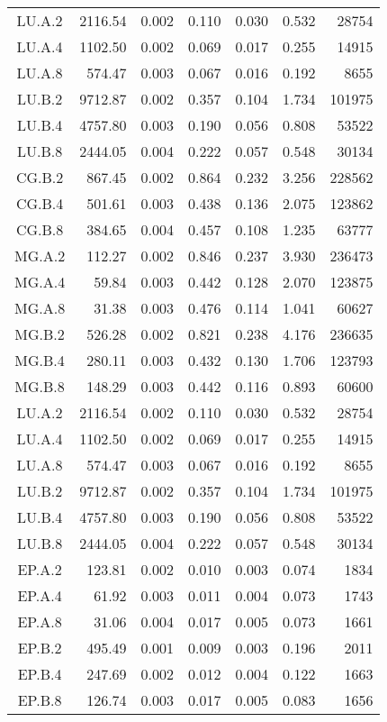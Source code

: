 \begin{longtable}[c]{c*{6}{r}}
	LU.A.2 & 2116.54 & 0.002 & 0.110 & 0.030 & 0.532 & 28754 \\
	LU.A.4 & 1102.50 & 0.002 & 0.069 & 0.017 & 0.255 & 14915 \\
	LU.A.8 & 574.47 & 0.003 & 0.067 & 0.016 & 0.192 & 8655 \\
	LU.B.2 & 9712.87 & 0.002 & 0.357 & 0.104 & 1.734 & 101975 \\
	LU.B.4 & 4757.80 & 0.003 & 0.190 & 0.056 & 0.808 & 53522 \\
	LU.B.8 & 2444.05 & 0.004 & 0.222 & 0.057 & 0.548 & 30134 \\
	CG.B.2 & 867.45 & 0.002 & 0.864 & 0.232 & 3.256 & 228562 \\
	CG.B.4 & 501.61 & 0.003 & 0.438 & 0.136 & 2.075 & 123862 \\
	CG.B.8 & 384.65 & 0.004 & 0.457 & 0.108 & 1.235 & 63777 \\
	MG.A.2 & 112.27 & 0.002 & 0.846 & 0.237 & 3.930 & 236473 \\
	MG.A.4 & 59.84 & 0.003 & 0.442 & 0.128 & 2.070 & 123875 \\
	MG.A.8 & 31.38 & 0.003 & 0.476 & 0.114 & 1.041 & 60627 \\
	MG.B.2 & 526.28 & 0.002 & 0.821 & 0.238 & 4.176 & 236635 \\
	MG.B.4 & 280.11 & 0.003 & 0.432 & 0.130 & 1.706 & 123793 \\
	MG.B.8 & 148.29 & 0.003 & 0.442 & 0.116 & 0.893 & 60600 \\
	LU.A.2 & 2116.54 & 0.002 & 0.110 & 0.030 & 0.532 & 28754 \\
	LU.A.4 & 1102.50 & 0.002 & 0.069 & 0.017 & 0.255 & 14915 \\
	LU.A.8 & 574.47 & 0.003 & 0.067 & 0.016 & 0.192 & 8655 \\
	LU.B.2 & 9712.87 & 0.002 & 0.357 & 0.104 & 1.734 & 101975 \\
	LU.B.4 & 4757.80 & 0.003 & 0.190 & 0.056 & 0.808 & 53522 \\
	LU.B.8 & 2444.05 & 0.004 & 0.222 & 0.057 & 0.548 & 30134 \\
	EP.A.2 & 123.81 & 0.002 & 0.010 & 0.003 & 0.074 & 1834 \\
	EP.A.4 & 61.92 & 0.003 & 0.011 & 0.004 & 0.073 & 1743 \\
	EP.A.8 & 31.06 & 0.004 & 0.017 & 0.005 & 0.073 & 1661 \\
	EP.B.2 & 495.49 & 0.001 & 0.009 & 0.003 & 0.196 & 2011 \\
	EP.B.4 & 247.69 & 0.002 & 0.012 & 0.004 & 0.122 & 1663 \\
	EP.B.8 & 126.74 & 0.003 & 0.017 & 0.005 & 0.083 & 1656 \\
	\bottomrule
\end{longtable}

